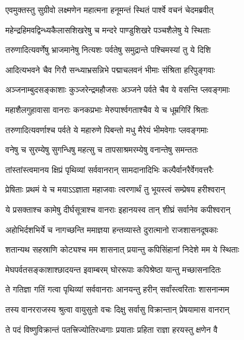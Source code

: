 
\twolineshloka
{एवमुक्तस्तु सुग्रीवो लक्ष्मणेन महात्मना}
{हनूमन्तं स्थितं पार्श्वे वचनं चेदमब्रवीत्} %

\twolineshloka
{महेन्द्रहिमवद्विन्ध्यकैलासशिखरेषु च}
{मन्दरे पाण्डुशिखरे पञ्चशैलेषु ये स्थिताः} %

\twolineshloka
{तरुणादित्यवर्णेषु भ्राजमानेषु नित्यशः}
{पर्वतेषु समुद्रान्ते पश्चिमस्यां तु ये दिशि} %

\twolineshloka
{आदित्यभवने चैव गिरौ सन्ध्याभ्रसन्निभे}
{पद्माचलवनं भीमाः संश्रिता हरिपुङ्गवाः} %

\twolineshloka
{अञ्जनाम्बुदसङ्काशाः कुञ्जरेन्द्रमहौजसः}
{अञ्जने पर्वते चैव ये वसन्ति प्लवङ्गमाः} %

\twolineshloka
{महाशैलगुहावासा वानराः कनकप्रभाः}
{मेरुपार्श्वगताश्चैव ये च धूम्रगिरिं श्रिताः} %

\twolineshloka
{तरुणादित्यवर्णाश्च पर्वते ये महारुणे}
{पिबन्तो मधु मैरेयं भीमवेगाः प्लवङ्गमाः} %

\twolineshloka
{वनेषु च सुरम्येषु सुगन्धिषु महत्सु च}
{तापसाश्रमरम्येषु वनान्तेषु समन्ततः} %

\twolineshloka
{तांस्तांस्त्वमानय क्षिप्रं पृथिव्यां सर्ववानरान्}
{सामदानादिभिः कल्पैर्वानरैर्वेगवत्तरैः} %

\twolineshloka
{प्रेषिताः प्रथमं ये च मयाऽऽज्ञाता महाजवाः}
{त्वरणार्थं तु भूयस्त्वं सम्प्रेषय हरीश्वरान्} %

\twolineshloka
{ये प्रसक्ताश्च कामेषु दीर्घसूत्राश्च वानराः}
{इहानयस्व तान् शीघ्रं सर्वानेव कपीश्वरान्} %

\twolineshloka
{अहोभिर्दशभिर्ये च नागच्छन्ति ममाज्ञया}
{हन्तव्यास्ते दुरात्मानो राजशासनदूषकाः} %

\twolineshloka
{शतान्यथ सहस्राणि कोट्यश्च मम शासनात्}
{प्रयान्तु कपिसिंहानां निदेशे मम ये स्थिताः} %

\twolineshloka
{मेघपर्वतसङ्काशाश्छादयन्त इवाम्बरम्}
{घोररूपाः कपिश्रेष्ठा यान्तु मच्छासनादितः} %

\twolineshloka
{ते गतिज्ञा गतिं गत्वा पृथिव्यां सर्ववानराः}
{आनयन्तु हरीन् सर्वांस्त्वरिताः शासनान्मम} %

\twolineshloka
{तस्य वानरराजस्य श्रुत्वा वायुसुतो वचः}
{दिक्षु सर्वासु विक्रान्तान् प्रेषयामास वानरान्} %

\twolineshloka
{ते पदं विष्णुविक्रान्तं पतत्त्रिज्योतिरध्वगाः}
{प्रयाताः प्रहिता राज्ञा हरयस्तु क्षणेन वै} %


